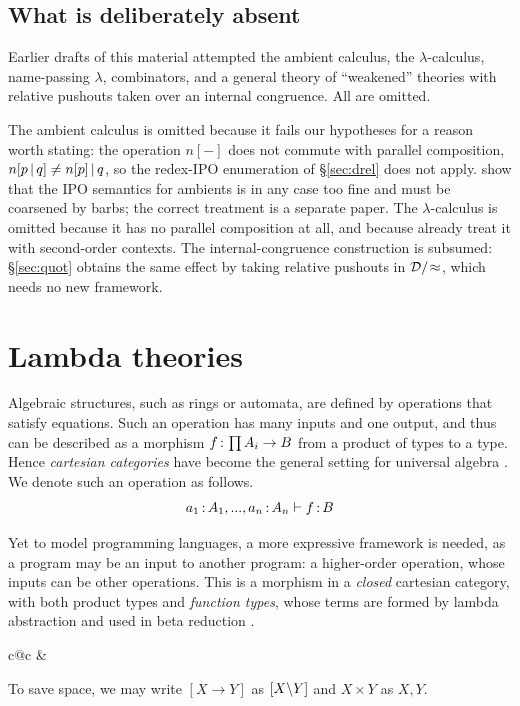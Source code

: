 \documentclass{article}
\begin{document}
\subsection{What is deliberately absent}

Earlier drafts of this material attempted the ambient calculus, the $\lambda$-calculus, name-passing $\lambda$, combinators, and a general theory of ``weakened'' theories with relative pushouts taken over an internal congruence. All are omitted.

The ambient calculus is omitted because it fails our hypotheses for a reason worth stating: the operation $n[-]$ does not commute with parallel composition, $n[p\,|\, q]\neq n[p]\,|\, q$, so the redex-IPO enumeration of \S\ref{sec:drel} does not apply. \citet{amb-ipo-lts-sos} show that the IPO semantics for ambients is in any case too fine and must be coarsened by barbs; the correct treatment is a separate paper. The $\lambda$-calculus is omitted because it has no parallel composition at all, and because \citet{lambda-lts} already treat it with second-order contexts. The internal-congruence construction is subsumed: \S\ref{sec:quot} obtains the same effect by taking relative pushouts in $\mathcal{D}/\!\approx$, which needs no new framework.
\section{Lambda theories}
\label{sec:lt}

Algebraic structures, such as rings or automata, are defined by operations that satisfy equations. Such an operation has many inputs and one output, and thus can be described as a morphism $f\,{:}\, \prod A_i\to B$ from a product of types to a type. Hence \textit{cartesian categories} have become the general setting for universal algebra \citep{algthy}. We denote such an operation as follows.
\[a_1\,{:}\, A_1, ..., a_n\,{:}\, A_n\vdash f\,{:}\, B\]

Yet to model programming languages, a more expressive framework is needed, as a program may be an input to another program: a higher-order operation, whose inputs can be other operations. This is a morphism in a \textit{closed} cartesian category, with both product types and \textit{function types}, whose terms are formed by lambda abstraction and used in beta reduction \citep{ccc}.
\begin{center}
    \begin{tabular}{c@{\qquad\qquad}c}
          &
    \end{tabular}
\end{center}
To save space, we may write $[X\to Y]$ as $[X{\setminus} Y]$ and $X\times Y$ as $X,Y$.
\end{document}
